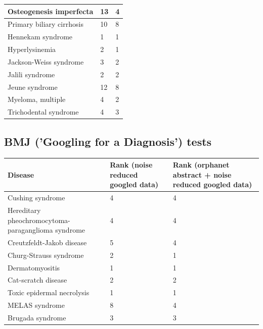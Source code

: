 \documentclass[10pt,letterpaper,final]{article}
\begin{document}
\begin{center}
\begin{small}
\begin{longtable}{|p{6cm}|p{2.5cm}|p{2.5cm}|}
Osteogenesis imperfecta                 &  13 & 4 \\ \hline
Primary biliary cirrhosis               &  10 & 8 \\ \hline
Hennekam syndrome                       & 1  & 1 \\ \hline
Hyperlysinemia                          & 2  & 1 \\ \hline
Jackson-Weiss syndrome                  &  3 & 2 \\ \hline
Jalili syndrome                         &  2 & 2 \\ \hline
Jeune syndrome                          &  12 & 8 \\ \hline
Myeloma, multiple                       &  4 & 2 \\ \hline
Trichodental syndrome                   &  4 & 3 \\ \hline
	\end{longtable}
\end{small}
\end{center}

\subsection{BMJ ('Googling for a Diagnosis') tests }
\label{app:bmj_with_without}
\begin{center}
\begin{small}
	\begin{tabular}{|p{6cm}|p{2.5cm}|p{2.5cm}|}
	\hline
	\textbf{Disease}  & \textbf{Rank (noise reduced googled data)} & \textbf{Rank (orphanet abstract + noise reduced googled data)} \\
	\hline\hline
Cushing syndrome                        &  4 & 4 \\ \hline
Hereditary pheochromocytoma-paraganglioma syndrome  &  4 & 4 \\ \hline
Creutzfeldt-Jakob disease               & 5  & 4 \\ \hline
Churg-Strauss syndrome                  &  2 & 1 \\ \hline
Dermatomyositis                         &  1 & 1 \\ \hline
Cat-scratch disease                     &  2 & 2 \\ \hline
Toxic epidermal necrolysis              &  1 & 1 \\ \hline
MELAS syndrome                          &  8 & 4 \\ \hline
Brugada syndrome                        &  3 & 3 \\ \hline
	\end{tabular}
\end{small}
\end{center}
\end{document}
